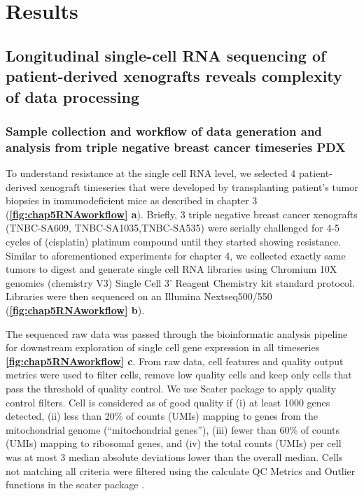 \section{Results}
 
 \subsection{Longitudinal single-cell RNA sequencing of patient-derived xenografts reveals complexity of data processing}
  
\subsubsection{Sample collection and workflow of data generation and analysis from triple negative breast cancer timeseries PDX}
To understand resistance at the single cell RNA level, we selected 4  patient-derived xenograft timeseries that were developed by transplanting patient's tumor biopsies in immunodeficient mice as described in chapter 3 (\textbf{\autoref{fig:chap5RNAworkflow} a}). 
Briefly, 3 triple negative breast cancer xenografts (TNBC-SA609, TNBC-SA1035,TNBC-SA535) were serially challenged for 4-5 cycles of (cisplatin) platinum compound until they started showing resistance.
Similar to aforementioned experiments for chapter 4, we collected exactly same tumors to digest and generate single cell RNA libraries using Chromium 10X genomics (chemistry V3) Single Cell 3' Reagent Chemistry kit standard protocol. Libraries were then sequenced on an Illumina Nextseq500/550 (\textbf{\autoref{fig:chap5RNAworkflow} b}). 

The sequenced raw data was passed through the bioinformatic analysis pipeline for downstream exploration of single cell gene expression in all timeseries \textbf{\autoref{fig:chap5RNAworkflow} c}. 
From raw data, cell features and quality output metrics were used to filter cells, remove low quality cells and keep only cells that pass the threshold of quality control. 
We use Scater package to apply quality control filters. Cell is considered as of good quality if (i) at least 1000 genes detected, (ii) less than 20\% of counts (UMIs) mapping to genes from the mitochondrial genome (``mitochondrial genes''), (iii) fewer than 60\% of counts (UMIs) mapping to ribosomal genes, and (iv) the total counts (UMIs) per cell was at most 3 median absolute deviations lower than the overall median. Cells not matching all criteria were filtered using the calculate \ac{QC} Metrics and Outlier functions in the scater package \cite{mccarthy2017scater}.

